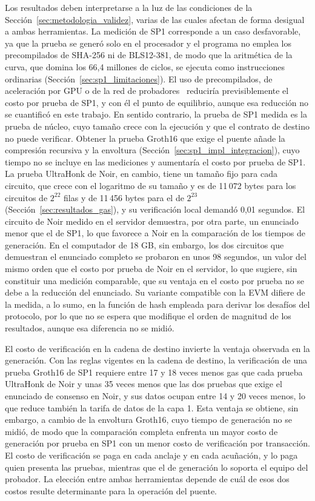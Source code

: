 Los resultados deben interpretarse a la luz de las condiciones de la
Sección~\ref{sec:metodologia_validez}, varias de las cuales afectan de forma desigual a ambas
herramientas. La medición de SP1 corresponde a un caso desfavorable, ya que la prueba se generó solo
en el procesador y el programa no emplea los precompilados de SHA-256 ni de BLS12-381, de modo que
la aritmética de la curva, que domina los 66,4 millones de ciclos, se ejecuta como instrucciones
ordinarias (Sección~\ref{sec:sp1_limitaciones}). El uso de precompilados, de aceleración por GPU o
de la red de probadores~\cite{succinctnetwork} reduciría previsiblemente el costo por prueba de SP1,
y con él el punto de equilibrio, aunque esa reducción no se cuantificó en este trabajo. En sentido
contrario, la prueba de SP1 medida es la prueba de núcleo, cuyo tamaño crece con la ejecución y que
el contrato de destino no puede verificar. Obtener la prueba Groth16 que exige el puente añade la
compresión recursiva y la envoltura (Sección~\ref{sec:sp1_impl_integracion}), cuyo tiempo no se
incluye en las mediciones y aumentaría el costo por prueba de SP1. La prueba UltraHonk de Noir, en
cambio, tiene un tamaño fijo para cada circuito, que crece con el logaritmo de su tamaño y es de
11\,072 bytes para los circuitos de $2^{22}$ filas y de 11\,456 bytes para el de $2^{23}$
(Sección~\ref{sec:resultados_gas}), y su verificación local demandó 0,01 segundos. El circuito de
Noir medido en el servidor demuestra, por otra parte, un enunciado menor que el de SP1, lo que
favorece a Noir en la comparación de los tiempos de generación. En el computador de 18 GB, sin
embargo, los dos circuitos que demuestran el enunciado completo se probaron en unos 98 segundos,
un valor del mismo orden que el costo por prueba de Noir en el servidor, lo que sugiere, sin
constituir una medición comparable, que su ventaja en el costo por prueba no se debe a la
reducción del enunciado. Su variante compatible con
la EVM difiere de la medida, a lo sumo, en la función de hash empleada para derivar los
desafíos del protocolo, por lo que no se espera que modifique el orden de magnitud de los
resultados, aunque esa diferencia no se midió.

El costo de verificación en la cadena de destino invierte la ventaja observada en la generación.
Con las reglas vigentes en la cadena de destino, la verificación de una prueba Groth16 de SP1
requiere entre 17 y 18 veces menos gas que cada prueba UltraHonk de Noir y unas 35 veces menos que
las dos pruebas que exige el enunciado de consenso en Noir, y sus datos ocupan entre 14 y 20 veces
menos, lo que reduce también la tarifa de datos de la capa 1. Esta ventaja se obtiene, sin embargo, a cambio de la envoltura
Groth16, cuyo tiempo de generación no se midió, de modo que la comparación completa enfrenta un
mayor costo de generación por prueba en SP1 con un menor costo de verificación por transacción. El
costo de verificación se paga en cada anclaje y en cada acuñación, y lo paga quien presenta las
pruebas, mientras que el de generación lo soporta el equipo del probador. La elección entre ambas
herramientas depende de cuál de esos dos costos resulte determinante para la
operación del puente.

